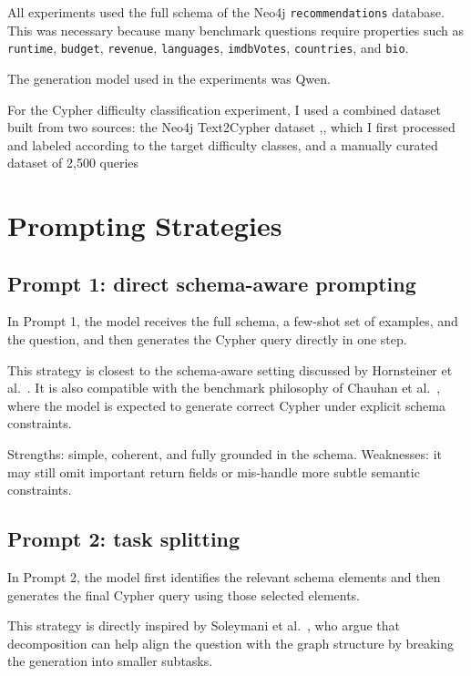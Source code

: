 \documentclass{article}
\begin{document}
All experiments used the full schema of the Neo4j \texttt{recommendations} database. This was necessary because many benchmark questions require properties such as \texttt{runtime}, \texttt{budget}, \texttt{revenue}, \texttt{languages}, \texttt{imdbVotes}, \texttt{countries}, and \texttt{bio}.

The generation model used in the experiments was Qwen.

For the Cypher difficulty classification experiment, I used a combined dataset built from two sources: the Neo4j Text2Cypher dataset  \cite{ozsoy2025text2cypher},, which I first processed and labeled according to the target difficulty classes, and a manually curated dataset of 2,500 queries

\section{Prompting Strategies}

\subsection{Prompt 1: direct schema-aware prompting}

In Prompt 1, the model receives the full schema, a few-shot set of examples, and the question, and then generates the Cypher query directly in one step.

This strategy is closest to the schema-aware setting discussed by Hornsteiner et al.~\cite{hornsteiner2024realtime}. It is also compatible with the benchmark philosophy of Chauhan et al.~\cite{chauhan2025mind}, where the model is expected to generate correct Cypher under explicit schema constraints.

Strengths: simple, coherent, and fully grounded in the schema. Weaknesses: it may still omit important return fields or mis-handle more subtle semantic constraints.

\subsection{Prompt 2: task splitting}

In Prompt 2, the model first identifies the relevant schema elements and then generates the final Cypher query using those selected elements.

This strategy is directly inspired by Soleymani et al.~\cite{soleymani2025tasksplitting}, who argue that decomposition can help align the question with the graph structure by breaking the generation into smaller subtasks.
\end{document}
